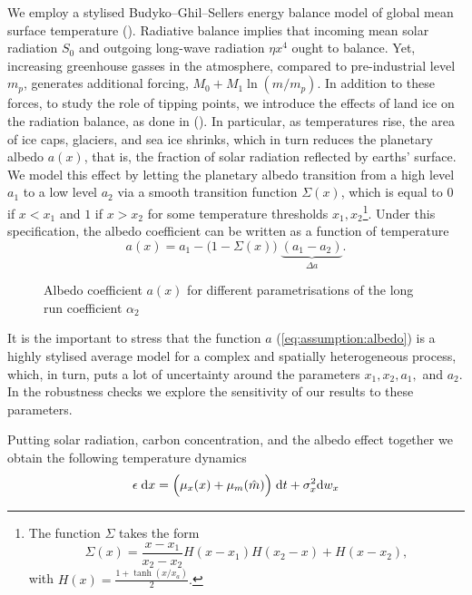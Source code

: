 \documentclass[../../main.tex]{subfiles}
\begin{document}
We employ a stylised Budyko–Ghil–Sellers energy balance model of global mean surface temperature (\cite{hogg_glacial_2008,ashwin_extreme_2020}). Radiative balance implies that incoming mean solar radiation $S_0$ and outgoing long-wave radiation $\eta x^4$ ought to balance. Yet, increasing greenhouse gasses in the atmosphere, compared to pre-industrial level $m_p$, generates additional forcing, $M_0 + M_1 \ln\left(m / m_p\right)$. In addition to these forces, to study the role of tipping points, we introduce the effects of land ice on the radiation balance, as done in (\cite{ghil_topics_2011,dijkstra_sensitivity_2015}). In particular, as temperatures rise, the area of ice caps, glaciers, and sea ice shrinks, which in turn reduces the planetary albedo $a(x)$, that is, the fraction of solar radiation reflected by earths' surface. We model this effect by letting the planetary albedo transition from a high level $a_1$ to a low level $a_2$ via a smooth transition function $\Sigma(x)$, which is equal to $0$ if $x < x_1$ and $1$ if $x > x_2$ for some temperature thresholds $x_1, x_2$\footnote{
    The function $\Sigma$ takes the form \begin{equation}
        \Sigma(x) = \frac{x - x_1}{x_2 - x_2} H(x - x_1) H(x_2 - x) + H(x - x_2),
    \end{equation} with $H(x) = \frac{1 + \tanh(x / x_a)}{2}.$
}. Under this specification, the albedo coefficient can be written as a function of temperature \begin{equation} \label{eq:assumption:albedo}
    a(x) = a_1 - \Big(1 - \Sigma(x)\Big) \; \underbrace{(a_1 - a_2)}_{\Delta a}.
\end{equation} 

\begin{figure}[H]
    \centering
    
    \caption{Albedo coefficient $a(x)$ for different parametrisations of the long run coefficient $\alpha_2$}
    \label{fig:albedo_coefficient}
\end{figure}

It is the important to stress that the function $a$ (\ref{eq:assumption:albedo}) is a highly stylised average model for a complex and spatially heterogeneous process, which, in turn, puts a lot of uncertainty around the parameters $x_1, x_2, a_1,$ and $a_2$. In the robustness checks we explore the sensitivity of our results to these parameters.

Putting solar radiation, carbon concentration, and the albedo effect together we obtain the following temperature dynamics \begin{equation} \label{eq:dynamics:x}
    \epsilon \; \text{d} x = \Big(\mu_x(x) + \mu_m(\hat m)\Big) \; \text{d} t + \sigma^2_x \text{d} w_x
\end{equation}
\end{document}
